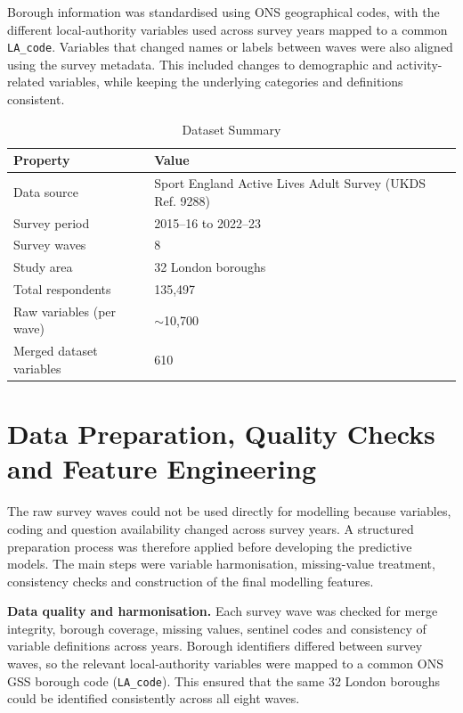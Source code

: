 \documentclass[ %
                    author={Ashrey Ashrey, Sanya Kapoor, Trisha Sharma, Yash Bhooshan Pandloskar},
                supervisor={Dr. Dalila O’Grady},
                    degree={MSc},
                     title={Using machine learning to forecast physical activity participation, volunteering and activity patterns in London},
                  subtitle={},
                      type={},
                      year={2021}]{dissertation}
\begin{document}
Borough information was standardised using ONS geographical codes, with the different local-authority variables used across survey years mapped to a common \texttt{LA\_code}. Variables that changed names or labels between waves were also aligned using the survey metadata. This included changes to demographic and activity-related variables, while keeping the underlying categories and definitions consistent.

\begin{table}[!htb]
\centering
\label{tab:dataset-summary}
\begin{tabular}{ll}
\toprule
\textbf{Property} & \textbf{Value} \\
\midrule
Data source              & Sport England Active Lives Adult Survey (UKDS Ref. 9288) \\
Survey period            & 2015--16 to 2022--23 \\
Survey waves             & 8 \\
Study area               & 32 London boroughs \\
Total respondents        & 135,497 \\
Raw variables (per wave) & $\sim$10,700 \\
Merged dataset variables & 610 \\
\bottomrule
\end{tabular}
\caption{Dataset Summary}
\end{table}

\FloatBarrier
\section{Data Preparation, Quality Checks and Feature Engineering}

\noindent
The raw survey waves could not be used directly for modelling because variables, coding and question availability changed across survey years. A structured preparation process was therefore applied before developing the predictive models. The main steps were variable harmonisation, missing-value treatment, consistency checks and construction of the final modelling features.

\noindent
\textbf{Data quality and harmonisation.} Each survey wave was checked for merge integrity, borough coverage, missing values, sentinel codes and consistency of variable definitions across years. Borough identifiers differed between survey waves, so the relevant local-authority variables were mapped to a common ONS GSS borough code (\texttt{LA\_code}). This ensured that the same 32 London boroughs could be identified consistently across all eight waves.
\end{document}

